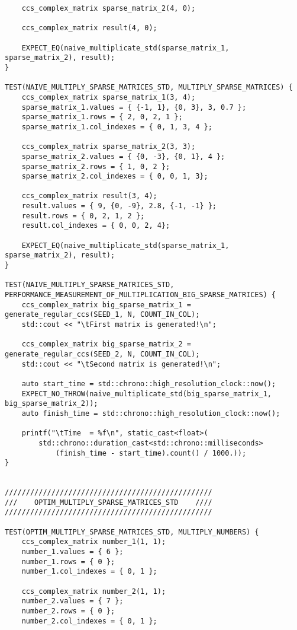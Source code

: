 \documentclass{report}
\begin{document}
\begin{lstlisting}
    ccs_complex_matrix sparse_matrix_2(4, 0);

    ccs_complex_matrix result(4, 0);

    EXPECT_EQ(naive_multiplicate_std(sparse_matrix_1, sparse_matrix_2), result);
}

TEST(NAIVE_MULTIPLY_SPARSE_MATRICES_STD, MULTIPLY_SPARSE_MATRICES) {
    ccs_complex_matrix sparse_matrix_1(3, 4);
    sparse_matrix_1.values = { {-1, 1}, {0, 3}, 3, 0.7 };
    sparse_matrix_1.rows = { 2, 0, 2, 1 };
    sparse_matrix_1.col_indexes = { 0, 1, 3, 4 };

    ccs_complex_matrix sparse_matrix_2(3, 3);
    sparse_matrix_2.values = { {0, -3}, {0, 1}, 4 };
    sparse_matrix_2.rows = { 1, 0, 2 };
    sparse_matrix_2.col_indexes = { 0, 0, 1, 3};

    ccs_complex_matrix result(3, 4);
    result.values = { 9, {0, -9}, 2.8, {-1, -1} };
    result.rows = { 0, 2, 1, 2 };
    result.col_indexes = { 0, 0, 2, 4};

    EXPECT_EQ(naive_multiplicate_std(sparse_matrix_1, sparse_matrix_2), result);
}

TEST(NAIVE_MULTIPLY_SPARSE_MATRICES_STD, PERFORMANCE_MEASUREMENT_OF_MULTIPLICATION_BIG_SPARSE_MATRICES) {
    ccs_complex_matrix big_sparse_matrix_1 = generate_regular_ccs(SEED_1, N, COUNT_IN_COL);
    std::cout << "\tFirst matrix is generated!\n";

    ccs_complex_matrix big_sparse_matrix_2 = generate_regular_ccs(SEED_2, N, COUNT_IN_COL);
    std::cout << "\tSecond matrix is generated!\n";

    auto start_time = std::chrono::high_resolution_clock::now();
    EXPECT_NO_THROW(naive_multiplicate_std(big_sparse_matrix_1, big_sparse_matrix_2));
    auto finish_time = std::chrono::high_resolution_clock::now();

    printf("\tTime  = %f\n", static_cast<float>(
        std::chrono::duration_cast<std::chrono::milliseconds>
            (finish_time - start_time).count() / 1000.));
}


/////////////////////////////////////////////////
///    OPTIM_MULTIPLY_SPARSE_MATRICES_STD    ////
/////////////////////////////////////////////////

TEST(OPTIM_MULTIPLY_SPARSE_MATRICES_STD, MULTIPLY_NUMBERS) {
    ccs_complex_matrix number_1(1, 1);
    number_1.values = { 6 };
    number_1.rows = { 0 };
    number_1.col_indexes = { 0, 1 };

    ccs_complex_matrix number_2(1, 1);
    number_2.values = { 7 };
    number_2.rows = { 0 };
    number_2.col_indexes = { 0, 1 };


\end{lstlisting}
\end{document}
